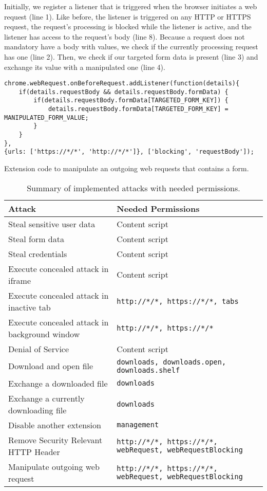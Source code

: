 	Initially, we register a listener that is triggered when the browser initiates a web request (line 1). Like before, the listener is triggered on any HTTP or HTTPS request, the request's processing is blocked while the listener is active, and the listener has access to the request's body (line 8). Because a request does not mandatory have a body with values, we check if the currently processing request has one (line 2). Then, we check if our targeted form data is present (line 3) and exchange its value with a manipulated one (line 4). 
	
	\begin{code}
		\begin{lstlisting}
chrome.webRequest.onBeforeRequest.addListener(function(details){
	if(details.requestBody && details.requestBody.formData) {
		if(details.requestBody.formData[TARGETED_FORM_KEY]) {
			details.requestBody.formData[TARGETED_FORM_KEY] = MANIPULATED_FORM_VALUE;
		}
	}
},
{urls: ['https://*/*', 'http://*/*']}, ['blocking', 'requestBody']);
\end{lstlisting}
		\caption{Extension code to manipulate an outgoing web requests that contains a form.}
		\label{code:manipulateWebRequestForm}
	\end{code}
	
	\begin{table}
		\begin{tabular}{|l|l|} \hline 
			\textbf{Attack} & \textbf{Needed Permissions} \\ \hline
			Steal sensitive user data & Content script \\
			Steal form data & Content script \\
			Steal credentials & Content script \\
			\hline
			Execute concealed attack in iframe & Content script \\
			Execute concealed attack in inactive tab & \texttt{http://*/*, https://*/*, tabs} \\
			Execute concealed attack in background window & \texttt{http://*/*, https://*/*} \\
			\hline
			Denial of Service & Content script \\
			\hline
			Download and open file & \texttt{downloads, downloads.open, downloads.shelf} \\
			Exchange a downloaded file & \texttt{downloads} \\
			Exchange a currently downloading file & \texttt{downloads} \\
			\hline
			Disable another extension & \texttt{management} \\
			\hline
			Remove Security Relevant HTTP Header & \texttt{http://*/*, https://*/*, webRequest, webRequestBlocking} \\
			Manipulate outgoing web request & \texttt{http://*/*, https://*/*, webRequest, webRequestBlocking} \\
			\hline
		\end{tabular}
		\caption{Summary of implemented attacks with needed permissions.}
	\end{table}